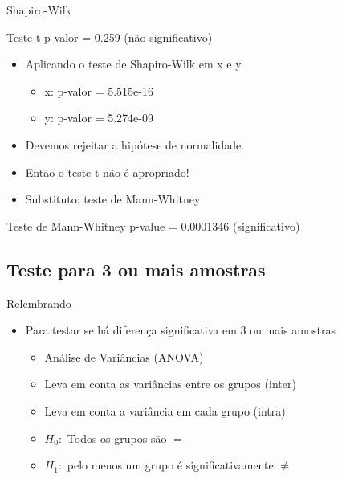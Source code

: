 \documentclass{beamer}
\begin{document}
\begin{frame}{Shapiro-Wilk}
  \begin{block}{Teste t}
    p-valor = 0.259 (não significativo)
  \end{block}
  \begin{itemize}
  \item<2-> Aplicando o teste de Shapiro-Wilk em x e y
    \begin{itemize}
    \item<2-> x: p-valor = 5.515e-16
    \item<2-> y: p-valor = 5.274e-09
    \end{itemize}
  \item Devemos rejeitar a hipótese de normalidade.
  \item Então o teste t \alert{não é} apropriado!
  \item Substituto: teste de Mann-Whitney
  \end{itemize}
  \begin{block}{Teste de Mann-Whitney}
    p-value = \alert{0.0001346} (significativo)
  \end{block}
\end{frame}

\subsection[3+ amostras]{Teste para 3 ou mais amostras}

\begin{frame}{Relembrando}
  \begin{itemize}
  \item Para testar se há diferença significativa em 3 ou mais amostras
    \begin{itemize}
    \item Análise de Variâncias (ANOVA)
    \item Leva em conta as variâncias entre os grupos (\alert{inter})
    \item Leva em conta a variância em cada grupo (\alert{intra})
    \item $H_0:$ Todos os grupos são $=$
    \item $H_1:$ pelo menos um grupo é significativamente $\ne$
    \end{itemize}
  \end{itemize}
\end{frame}
\end{document}
